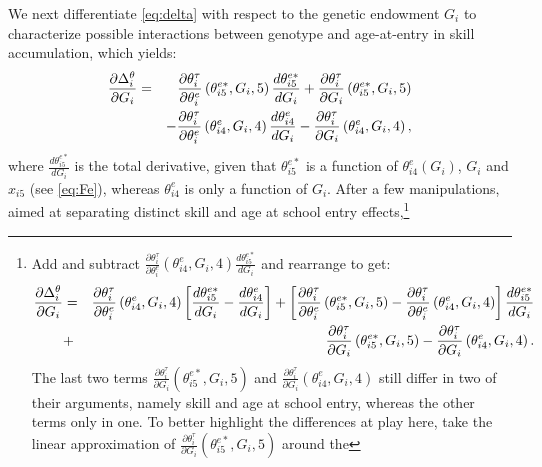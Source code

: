 \documentclass[12pt,a4paper]{article}
\begin{document}
\begin{bibunit}
We next differentiate \autoref{eq:delta} with respect to the genetic endowment $G_{i}$ to characterize possible interactions between genotype and age-at-entry in skill accumulation, which yields:
\begin{eqnarray}
\frac{\partial \Delta_{i}^{\theta}}{\partial G_{i}} &=&   \frac{\partial \theta_{i}^{\tau}}{\partial \theta_{i}^e}\left(\theta_{i 5}^{e*}, G_{i}, 5\right) \frac{d \theta_{i 5}^{e*}}{d G_i} +  \frac{\partial \theta_{i}^{\tau}}{\partial G_i}\left(\theta_{i 5}^{e*}, G_{i}, 5\right) \notag \\
 && - \frac{\partial \theta_{i}^{\tau}}{\partial \theta_{i}^e}\left(\theta_{i 4}^{e}, G_{i}, 4\right)\frac{d \theta_{i 4}^{e}}{d G_i} -  \frac{\partial \theta_{i}^{\tau}}{\partial G_i}\left(\theta_{i 4}^{e}, G_{i}, 4\right), 
\label{eqn:GxEModel1ststep}
\end{eqnarray}
where $\frac{d \theta_{i 5}^{e*}}{d G_i}$ is the total derivative, given that $\theta_{i 5}^{e*}$ is a function of $\theta^{e}_{i4}(G_{i})$, $G_i$ and $x_{i5}$ (see \autoref{eq:Fe}), whereas $\theta^e_{i 4}$ is only a function of $G_i$. After a few manipulations, aimed at separating distinct skill and age at school entry effects,\footnote{
Add and subtract $\frac{\partial \theta_{i}^{\tau}}{\partial \theta_{i}^e}\left(\theta_{i 4}^{e}, G_{i}, 4\right) \frac{d \theta_{i 5}^{e*}}{d G_i}$ and rearrange to get:  
\begin{eqnarray}
\frac{\partial \Delta_{i}^{\theta}}{\partial G_{i}} &=&   \frac{\partial \theta_{i}^{\tau}}{\partial \theta_{i}^e}\left(\theta_{i 4}^{e}, G_{i}, 4\right) \left[ \frac{d \theta_{i 5}^{e*}}{d  G_i} - \frac{d \theta_{i 4}^{e}}{d G_i}\right] + \left[ \frac{\partial \theta_{i}^{\tau}}{\partial \theta_{i}^e}\left(\theta_{i 5}^{e*}, G_{i}, 5\right)-\frac{\partial \theta_{i}^{\tau}}{\partial \theta_{i}^e}\left(\theta_{i 4}^{e}, G_{i}, 4\right)\right]\frac{d \theta_{i 5}^{e*}}{d G_i} \notag \\   
  &+&  \frac{\partial \theta_{i}^{\tau}}{\partial G_i}\left(\theta_{i 5}^{e*}, G_{i}, 5\right) -  \frac{\partial \theta_{i}^{\tau}}{\partial G_i}\left(\theta_{i 4}^{e}, G_{i}, 4\right) \nonumber. 
\label{eqn:GxEModelstep}
\end{eqnarray}
The last two terms $\frac{\partial \theta_{i}^{\tau}}{\partial G_i}\left(\theta_{i 5}^{e*}, G_{i}, 5\right)$ and   $\frac{\partial \theta_{i}^{\tau}}{\partial G_i}\left(\theta_{i 4}^{e}, G_{i}, 4\right)$ still differ in two of their arguments, namely skill and age at school entry, whereas the other terms  only in one. To better highlight the differences at play here, take the linear approximation of $\frac{\partial \theta_{i}^{\tau}}{\partial G_i}(\theta^{e*}_{i5}, G_{i}, 5)$ around the 
}
\end{bibunit}
\end{document}
